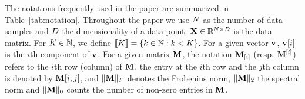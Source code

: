 
The notations frequently used in the paper are summarized in Table~\ref{tab:notation}. 
%
Throughout the paper we use $N$ as the number of data samples and $D$ the dimensionality of a data point. 
${\mathbf{X}} \in \mathbb{R}^{N \times D}$ is the data matrix. 
For $K \in {\mathbb{N}}$, we define $[\![K]\!]=\left \lbrace k\in {\mathbb{N}}: k < K\right \rbrace$.
%
For a given vector ${\mathbf{v}}$, ${\mathbf{v}}[i]$ is the $i$th component of ${\mathbf{v}}$.
%
For a given matrix ${\mathbf{M}}$, the notation ${\mathbf{M}}_{[i]}$ (resp. ${\mathbf{M}}^{[i]}$) refers to the $i$th row (column) of ${\mathbf{M}}$, the entry at the $i$th row and the $j$th column is denoted by ${\mathbf{M}}[i,j]$, and $\|{\mathbf{M}}\|_F$ denotes the Frobenius norm, $\|{\mathbf{M}}\|_2$ the spectral norm and $\|{\mathbf{M}}\|_0$ counts the number of non-zero entries in ${\mathbf{M}}$. 




